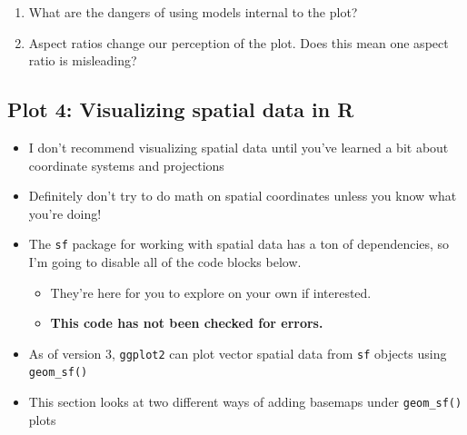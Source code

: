 \documentclass[
]{article}
\providecommand{\tightlist}{%
  \setlength{\itemsep}{0pt}\setlength{\parskip}{0pt}}
\begin{document}
\begin{enumerate}
\def\labelenumi{\arabic{enumi}.}
\tightlist
\item
  What are the dangers of using models internal to the plot?\\
\item
  Aspect ratios change our perception of the plot. Does this mean one aspect ratio is misleading?
\end{enumerate}

\hypertarget{plot-4-visualizing-spatial-data-in-r}{%
\subsection{Plot 4: Visualizing spatial data in R}\label{plot-4-visualizing-spatial-data-in-r}}

\begin{itemize}
\tightlist
\item
  I don't recommend visualizing spatial data until you've learned a bit about coordinate systems and projections
\item
  Definitely don't try to do math on spatial coordinates unless you know what you're doing!
\item
  The \texttt{sf} package for working with spatial data has a ton of dependencies, so I'm going to disable all of the code blocks below.

  \begin{itemize}
  \tightlist
  \item
    They're here for you to explore on your own if interested.\\
  \item
    \textbf{This code has not been checked for errors.}
  \end{itemize}
\item
  As of version 3, \texttt{ggplot2} can plot vector spatial data from \texttt{sf} objects using \texttt{geom\_sf()}
\item
  This section looks at two different ways of adding basemaps under \texttt{geom\_sf()} plots
\end{itemize}
\end{document}
